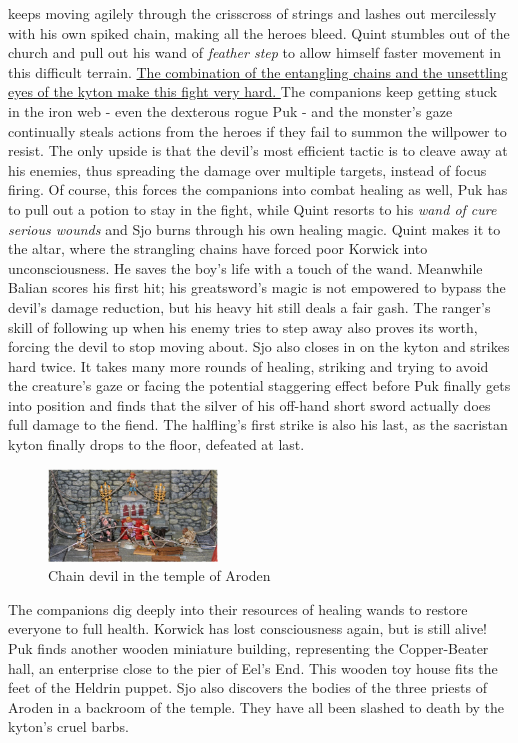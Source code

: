 keeps moving agilely through the crisscross of strings and lashes out mercilessly with his own spiked chain, making all the heroes bleed. Quint stumbles out of the church and pull out his wand of  {\itshape feather step} to allow himself faster movement in this difficult terrain. \hyperref[fig:Chain-devil-in-the-temple-of-Aroden-555419466]{ The combination of the entangling chains and the unsettling eyes of the kyton make this fight very hard. } The companions keep getting stuck in the iron web - even the dexterous rogue Puk - and the monster's gaze continually steals actions from the heroes if they fail to summon the willpower to resist. The only upside is that the devil's most efficient tactic is to cleave away at his enemies, thus spreading the damage over multiple targets, instead of focus firing. Of course, this forces the companions into combat healing as well, Puk has to pull out a potion to stay in the fight, while Quint resorts to his  {\itshape wand of cure serious wounds} and Sjo burns through his own healing magic. Quint makes it to the altar, where the strangling chains have forced poor Korwick into unconsciousness. He saves the boy's life with a touch of the wand. Meanwhile Balian scores his first hit; his greatsword's magic is not empowered to bypass the devil's damage reduction, but his heavy hit still deals a fair gash. The ranger's skill of following up when his enemy tries to step away also proves its worth, forcing the devil to stop moving about. Sjo also closes in on the kyton and strikes hard twice. It takes many more rounds of healing, striking and trying to avoid the creature's gaze or facing the potential staggering effect before Puk finally gets into position and finds that the silver of his off-hand short sword actually does full damage to the fiend. The halfling's first strike is also his last, as the sacristan kyton finally drops to the floor, defeated at last. \\

\begin{figure}[h]
	\centering
	\includegraphics[width=0.4\textwidth]{images/Chain-devil-in-the-temple-of-Aroden-555419466_mod.jpg}
	\caption{Chain devil in the temple of Aroden}
	\label{fig:Chain-devil-in-the-temple-of-Aroden-555419466}
\end{figure}

The companions dig deeply into their resources of healing wands to restore everyone to full health. Korwick has lost consciousness again, but is still alive! Puk finds another wooden miniature building, representing the Copper-Beater hall, an enterprise close to the pier of Eel's End. This wooden toy house fits the feet of the Heldrin puppet. Sjo also discovers the bodies of the three priests of Aroden in a backroom of the temple. They have all been slashed to death by the kyton's cruel barbs.\\

